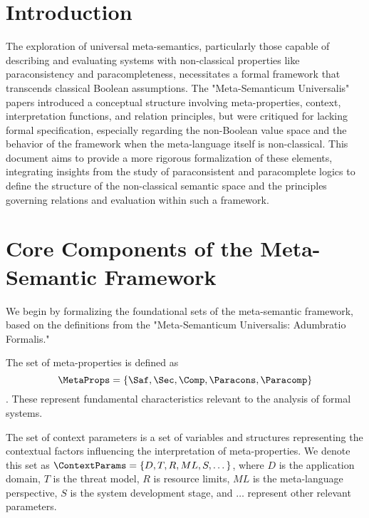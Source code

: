 	\section{Introduction}
	The exploration of universal meta-semantics, particularly those capable of describing and evaluating systems with non-classical properties like paraconsistency and paracompleteness, necessitates a formal framework that transcends classical Boolean assumptions. The "Meta-Semanticum Universalis" papers introduced a conceptual structure involving meta-properties, context, interpretation functions, and relation principles, but were critiqued for lacking formal specification, especially regarding the non-Boolean value space and the behavior of the framework when the meta-language itself is non-classical. This document aims to provide a more rigorous formalization of these elements, integrating insights from the study of paraconsistent and paracomplete logics to define the structure of the non-classical semantic space and the principles governing relations and evaluation within such a framework.
	
	\section{Core Components of the Meta-Semantic Framework}
	
	We begin by formalizing the foundational sets of the meta-semantic framework, based on the definitions from the "Meta-Semanticum Universalis: Adumbratio Formalis."
	
	\begin{definition}
		The set of meta-properties is defined as $$\MetaProps = \{ \Saf, \Sec, \Comp, \Paracons, \Paracomp \}$$. These represent fundamental characteristics relevant to the analysis of formal systems.
	\end{definition}
	
	\begin{definition}
		The set of context parameters is a set of variables and structures representing the contextual factors influencing the interpretation of meta-properties. We denote this set as $\ContextParams = \{ D, T, R, ML, S, \dots \}$, where $D$ is the application domain, $T$ is the threat model, $R$ is resource limits, $ML$ is the meta-language perspective, $S$ is the system development stage, and $\dots$ represent other relevant parameters.
	\end{definition}
	
